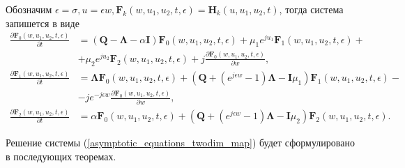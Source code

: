 Обозначим $\epsilon = \sigma,   u= \epsilon w,   \boldsymbol{F}_{k}(w,u_{1},u_{2},t,\epsilon) = \boldsymbol{H}_{k}(u,u_{1},u_{2},t)$, тогда система запишется в виде
\begin{equation} \label{asymptotic_equations_twodim_map}
	\begin{split}
		\frac{{\partial \boldsymbol{F}_{0}(w,u_{1},u_{2},t,\epsilon)}}{{\partial t}} &= (\boldsymbol{Q}-\boldsymbol{\Lambda}-\alpha\boldsymbol{I})\boldsymbol{F}_{0}(w,u_{1},u_{2},t,\epsilon) + \mu_{1} e^{ju_{1}}\boldsymbol{F}_{1}(w,u_{1},u_{2},t,\epsilon)  + \\  &+ \mu_{2}e^{ju_{2}}\boldsymbol{F}_{2}(w,u_{1},u_{2},t,\epsilon) + j
	\frac{{\partial \boldsymbol{F}_{0}(w,u_{1},u_{2},t,\epsilon)}}{{\partial w}},
	\\
	\frac{{\partial \boldsymbol{F}_{1}(w,u_{1},u_{2},t,\epsilon)}}{{\partial t}} &= \boldsymbol{\Lambda} \boldsymbol{F}_{0}(w,u_{1},u_{2},t,\epsilon) +  (\boldsymbol{Q}+(e^{j\epsilon w}-1)\boldsymbol{\Lambda} - \boldsymbol{I}\mu_{1})\boldsymbol{F}_{1}(w,u_{1},u_{2},t,\epsilon) -\\ &- j e^{-j\epsilon w}
	\frac{{\partial \boldsymbol{F}_{0}(w,u_{1},u_{2},t,\epsilon)}}{{\partial w}},
	\\
	\frac{{\partial \boldsymbol{F}_{2}(w,u_{1},u_{2},t,\epsilon)}}{{\partial t}} &= \alpha \boldsymbol{F}_{0}(w,u_{1},u_{2},t,\epsilon) + (\boldsymbol{Q}+(e^{j\epsilon w}-1)\boldsymbol{\Lambda} - \boldsymbol{I}\mu_{2})\boldsymbol{F}_{2}(w,u_{1},u_{2},t,\epsilon).
	\end{split}
\end{equation}  

Решение системы (\ref{asymptotic_equations_twodim_map}) будет сформулировано в последующих теоремах.

